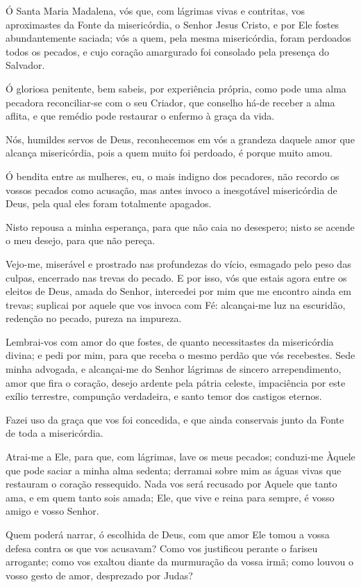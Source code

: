 \documentclass[a4paper,12pt]{extarticle}
\begin{document}
Ó Santa Maria Madalena, vós que, com lágrimas vivas e contritas, vos aproximastes da Fonte da misericórdia, o Senhor Jesus Cristo, e por Ele fostes abundantemente saciada; vós a quem, pela mesma misericórdia, foram perdoados todos os pecados, e cujo coração amargurado foi consolado pela presença do Salvador.

Ó gloriosa penitente, bem sabeis, por experiência própria, como pode uma alma pecadora reconciliar-se com o seu Criador, que conselho há-de receber a alma aflita, e que remédio pode restaurar o enfermo à graça da vida.

Nós, humildes servos de Deus, reconhecemos em vós a grandeza daquele amor que alcança misericórdia, pois a quem muito foi perdoado, é porque muito amou.

Ó bendita entre as mulheres, eu, o mais indigno dos pecadores, não recordo os vossos pecados como acusação, mas antes invoco a inesgotável misericórdia de Deus, pela qual eles foram totalmente apagados.

Nisto repousa a minha esperança, para que não caia no desespero; nisto se acende o meu desejo, para que não pereça.

Vejo-me, miserável e prostrado nas profundezas do vício, esmagado pelo peso das culpas, encerrado nas trevas do pecado. E por isso, vós que estais agora entre os eleitos de Deus, amada do Senhor, intercedei por mim que me encontro ainda em trevas; suplicai por aquele que vos invoca com Fé: alcançai-me luz na escuridão, redenção no pecado, pureza na impureza.

Lembrai-vos com amor do que fostes, de quanto necessitastes da misericórdia divina; e pedi por mim, para que receba o mesmo perdão que vós recebestes. Sede minha advogada, e alcançai-me do Senhor lágrimas de sincero arrependimento, amor que fira o coração, desejo ardente pela pátria celeste, impaciência por este exílio terrestre, compunção verdadeira, e santo temor dos castigos eternos.

Fazei uso da graça que vos foi concedida, e que ainda conservais junto da Fonte de toda a misericórdia.

Atrai-me a Ele, para que, com lágrimas, lave os meus pecados; conduzi-me Àquele que pode saciar a minha alma sedenta; derramai sobre mim as águas vivas que restauram o coração ressequido. Nada vos será recusado por Aquele que tanto ama, e em quem tanto sois amada; Ele, que vive e reina para sempre, é vosso amigo e vosso Senhor.

Quem poderá narrar, ó escolhida de Deus, com que amor Ele tomou a vossa defesa contra os que vos acusavam? Como vos justificou perante o fariseu arrogante; como vos exaltou diante da murmuração da vossa irmã; como louvou o vosso gesto de amor, desprezado por Judas?
\end{document}
